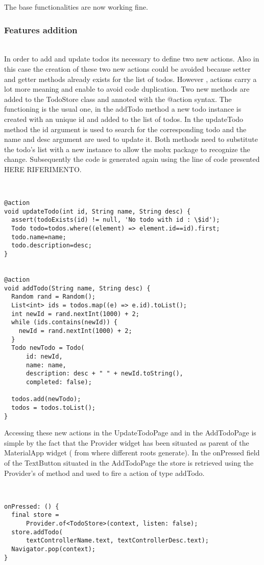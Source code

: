 The base functionalities are now working fine.
\subsubsection{Features addition} \mbox{}\\ \label{par:todo_app_inherited_widget_introduction}In order to add and update todos its necessary to define two new actions. Also in this case the creation of these two new actions could be avoided because setter and getter methods already exists for the list of todos. However , actions carry a lot more meaning and enable to avoid code duplication. Two new methods are added to the TodoStore class and annoted with the @action syntax. The functioning is the usual one, in the addTodo method a new todo instance is created with an unique id and added to the list of todos. In the updateTodo method the id argument is used to search for the corresponding todo and the name and desc argument are used to update it. Both methods need to substitute the todo’s list with a new instance to allow the mobx package to recognize the change. Subsequently the code is generated again using the line of code presented HERE RIFERIMENTO.
\begin{code}
\mbox{}\\
 \mbox{}
		\label{code:2.14}
\begin{verbatim}
@action
void updateTodo(int id, String name, String desc) {
  assert(todoExists(id) != null, 'No todo with id : \$id');
  Todo todo=todos.where((element) => element.id==id).first;
  todo.name=name;
  todo.description=desc;
}


@action
void addTodo(String name, String desc) {
  Random rand = Random();
  List<int> ids = todos.map((e) => e.id).toList();
  int newId = rand.nextInt(1000) + 2;
  while (ids.contains(newId)) {
    newId = rand.nextInt(1000) + 2;
  }
  Todo newTodo = Todo(
      id: newId,
      name: name,
      description: desc + " " + newId.toString(),
      completed: false);

  todos.add(newTodo);
  todos = todos.toList();
}
\end{verbatim}
\mbox{}
\end{code}

Accessing these new actions in the UpdateTodoPage and in the AddTodoPage is simple by the fact that the Provider widget has been situated as parent of the MaterialApp widget ( from where different roots generate). In the onPressed field of the TextButton situated in the AddTodoPage the store is retrieved using the Provider’s of method and used to fire a action of type addTodo. 
\begin{code}
\mbox{}\\
 \mbox{}
		\label{code:2.14}
\begin{verbatim}
onPressed: () {
  final store =
      Provider.of<TodoStore>(context, listen: false);
  store.addTodo(
      textControllerName.text, textControllerDesc.text);
  Navigator.pop(context);
}
\end{verbatim}
\mbox{}
\end{code}

